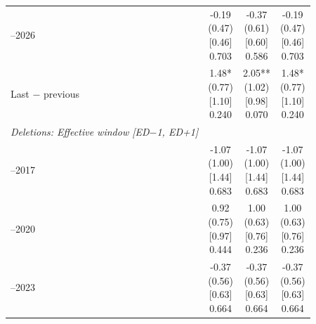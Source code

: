 \begin{threeparttable}
\begin{tabular}{@{}lccc}
\addlinespace[0.25ex]
\addlinespace[0.25ex]
2024–2026 & \makecell{-0.19\\(0.47)\\{}[0.46]\\{0.703}} & \makecell{-0.37\\(0.61)\\{}[0.60]\\{0.586}} & \makecell{-0.19\\(0.47)\\{}[0.46]\\{0.703}} \\
\addlinespace[0.25ex]
\addlinespace[0.25ex]
Last $-$ previous & \makecell{1.48*\\(0.77)\\{}[1.10]\\{0.240}} & \makecell{2.05**\\(1.02)\\{}[0.98]\\{0.070}} & \makecell{1.48*\\(0.77)\\{}[1.10]\\{0.240}} \\
\addlinespace[0.25ex]
\midrule
\emph{Deletions: Effective window [ED$-$1, ED+1]} \\
\addlinespace[0.25ex]
\addlinespace[1ex]
2013–2017 & \makecell{-1.07\\(1.00)\\{}[1.44]\\{0.683}} & \makecell{-1.07\\(1.00)\\{}[1.44]\\{0.683}} & \makecell{-1.07\\(1.00)\\{}[1.44]\\{0.683}} \\
\addlinespace[0.25ex]
\addlinespace[0.25ex]
2018–2020 & \makecell{0.92\\(0.75)\\{}[0.97]\\{0.444}} & \makecell{1.00\\(0.63)\\{}[0.76]\\{0.236}} & \makecell{1.00\\(0.63)\\{}[0.76]\\{0.236}} \\
\addlinespace[0.25ex]
\addlinespace[0.25ex]
2021–2023 & \makecell{-0.37\\(0.56)\\{}[0.63]\\{0.664}} & \makecell{-0.37\\(0.56)\\{}[0.63]\\{0.664}} & \makecell{-0.37\\(0.56)\\{}[0.63]\\{0.664}} \\

\end{tabular}
\end{threeparttable}
